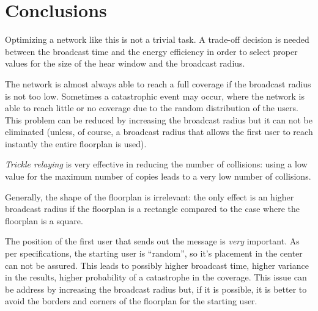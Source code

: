 \chapter{Conclusions}\label{ch:conclusions}

Optimizing a network like this is not a trivial task. A trade-off decision is
needed between the broadcast time and the energy efficiency in order to select
proper values for the size of the hear window and the broadcast radius.

The network is almost always able to reach a full coverage if the broadcast
radius is not too low. Sometimes a catastrophic event may occur, where the
network is able to reach little or no coverage due to the random distribution of
the users. This problem can be reduced by increasing the broadcast radius but it
can not be eliminated (unless, of course, a broadcast radius that allows the
first user to reach instantly the entire floorplan is used).

\emph{Trickle relaying} is very effective in reducing the number of collisions:
using a low value for the maximum number of copies leads to a very low number of
collisions.

Generally, the shape of the floorplan is irrelevant: the only effect is an
higher broadcast radius if the floorplan is a rectangle compared to the case
where the floorplan is a square.

The position of the first user that sends out the message is \emph{very}
important. As per specifications, the starting user is ``random'', so it's
placement in the center can not be assured. This leads to possibly higher
broadcast time, higher variance in the results, higher probability of a
catastrophe in the coverage. This issue can be address by increasing the
broadcast radius but, if it is possible, it is better to avoid the borders and
corners of the floorplan for the starting user.
